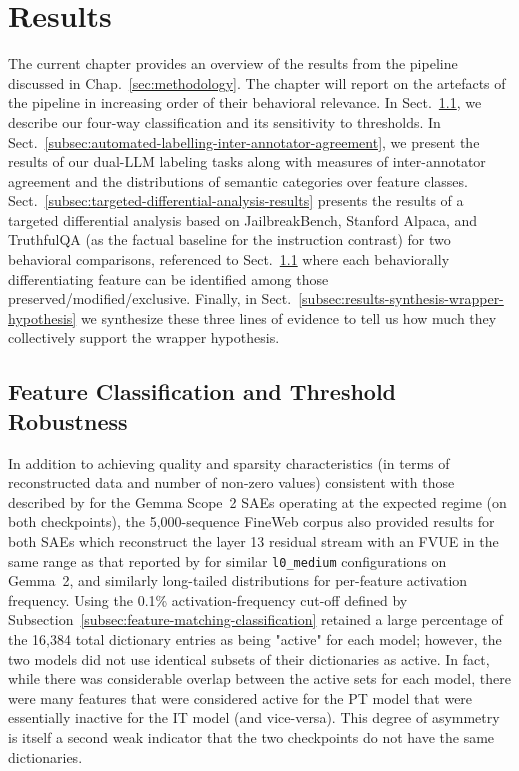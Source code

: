 \pagestyle{fancy}

\section{Results}
\label{sec:results}

The current chapter provides an overview of the results from the pipeline discussed in Chap.~\ref{sec:methodology}. The chapter will report on the artefacts of the pipeline in increasing order of their behavioral relevance. In Sect.~\ref{subsec:feature-classification-threshold-robustness}, we describe our four-way classification and its sensitivity to thresholds. In Sect.~\ref{subsec:automated-labelling-inter-annotator-agreement}, we present the results of our dual-LLM labeling tasks along with measures of inter-annotator agreement and the distributions of semantic categories over feature classes. Sect.~\ref{subsec:targeted-differential-analysis-results} presents the results of a targeted differential analysis based on JailbreakBench, Stanford Alpaca, and TruthfulQA (as the factual baseline for the instruction contrast) for two behavioral comparisons, referenced to Sect.~\ref{subsec:feature-classification-threshold-robustness} where each behaviorally differentiating feature can be identified among those preserved/modified/exclusive. Finally, in Sect.~\ref{subsec:results-synthesis-wrapper-hypothesis} we synthesize these three lines of evidence to tell us how much they collectively support the wrapper hypothesis.

\subsection{Feature Classification and Threshold Robustness}
\label{subsec:feature-classification-threshold-robustness}

In addition to achieving quality and sparsity characteristics (in terms of reconstructed data and number of non-zero values) consistent with those described by \parencite{mcdougall_gemma_scope_2_2025} for the Gemma Scope~2 SAEs operating at the expected regime (on both checkpoints), the 5,000-sequence FineWeb corpus also provided results for both SAEs which reconstruct the layer 13 residual stream with an FVUE in the same range as that reported by \textcite{lieberum_gemma_2024} for similar \texttt{l0\_medium} configurations on Gemma~2, and similarly long-tailed distributions for per-feature activation frequency. Using the 0.1\% activation-frequency cut-off defined by Subsection~\ref{subsec:feature-matching-classification} retained a large percentage of the 16,384 total dictionary entries as being "active" for each model; however, the two models did not use identical subsets of their dictionaries as active. In fact, while there was considerable overlap between the active sets for each model, there were many features that were considered active for the PT model that were essentially inactive for the IT model (and vice-versa). This degree of asymmetry is itself a second weak indicator that the two checkpoints do not have the same dictionaries.

